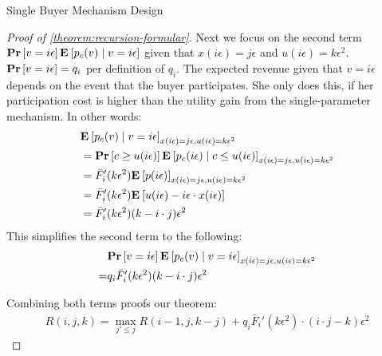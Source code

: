 \documentclass[11pt,a4paper]{article}
\renewcommand{\Pr}[1]{\mbox{\rm\bf Pr}\left[#1\right]}
\newcommand{\Ex}[2][]{\mbox{\rm\bf E}_{#1}\left[#2\right]}
\newcommand{\1}[1]{\mbox{\rm\bf 1}_{#1}}
\begin{document}
\begin{section}{Single Buyer Mechanism Design}
\begin{proof}[Proof of \autoref{theorem:recursion-formular}]
     Next we focus on the second term $\Pr{v = i \epsilon} \Ex{p_c(v) \mid v = i \epsilon}$ given that $x(i\epsilon) = j\epsilon$ and $u(i\epsilon) = k\epsilon^2$.
     $\Pr{v = i \epsilon} = q_i$ per definition of $q_i$.
     The expected revenue given that $v = i \epsilon$ depends on the event that the buyer participates.
     She only does this, if her participation cost is higher than the utility gain from the single-parameter mechanism.
     In other words:
     \begin{align*}
          & \Ex{p_c(v) \mid v = i \epsilon}_{x(i\epsilon) = j \epsilon, u(i\epsilon) = k\epsilon^2}                                         \\
          & = \Pr{c \geq u(i\epsilon)} \Ex{p_c(i\epsilon) \mid c \leq u(i\epsilon)}_{x(i\epsilon) = j \epsilon, u(i\epsilon) = k\epsilon^2} \\
          & = \bar{F}_i'(k\epsilon^2) \Ex{p(i\epsilon)}_{x(i\epsilon) = j \epsilon, u(i\epsilon) = k\epsilon^2}                             \\
          & = \bar{F}_i'(k\epsilon^2) \Ex{u(i\epsilon) - i\epsilon \cdot x(i\epsilon)}                                                      \\
          & = \bar{F}_i'(k\epsilon^2) (k - i \cdot j)\epsilon^2
     \end{align*}
     This simplifies the second term to the following:
     \begin{align*}
           & \Pr{v = i \epsilon} \Ex{p_c(v) \mid v = i \epsilon}_{x(i\epsilon) = j \epsilon, u(i\epsilon) = k\epsilon^2} \\
         = & q_i \bar{F}_i'(k\epsilon^2) (k - i \cdot j)\epsilon^2
     \end{align*}

     Combining both terms proofs our theorem:
     \begin{align*}
         R(i,j,k) = \max_{j' \leq j} R(i-1, j, k - j) + q_i \bar{F}_i'(k \epsilon^2) \cdot (i\cdot j - k)\epsilon^2
     \end{align*}
 \end{proof}


\end{section}
\end{document}
